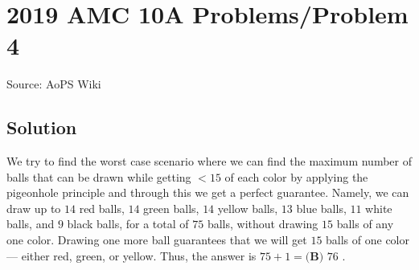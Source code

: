 \documentclass[12pt]{article}
\begin{document}
\section*{{2019 AMC 10A Problems/Problem 4}}
Source: AoPS Wiki

\subsection*{Solution}
We try to find the worst case scenario where we can find the maximum number of balls that can be drawn while getting $<15$ of each color by applying the pigeonhole principle and through this we get a perfect guarantee.
Namely, we can draw up to $14$ red balls, $14$ green balls, $14$ yellow balls, $13$ blue balls, $11$ white balls, and $9$ black balls, for a total of $75$ balls, without drawing $15$ balls of any one color. Drawing one more ball guarantees that we will get $15$ balls of one color — either red, green, or yellow. Thus, the answer is $75 + 1 = \boxed{\textbf{(B) } 76}$ .
\end{document}
